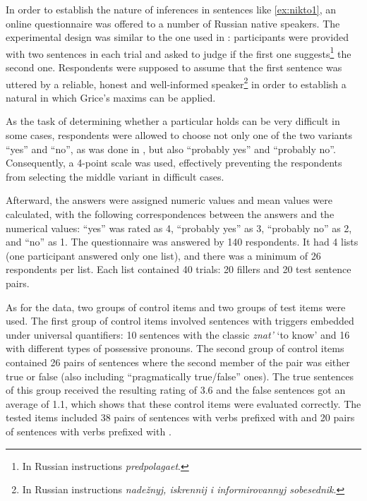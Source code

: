 In order to establish the nature of inferences in sentences like \ref{ex:nikto1}, an online questionnaire was offered to a number of Russian native speakers. The experimental design was similar to the one used in \citealt{Chemla:09}: participants were provided with two sentences in each trial and asked to judge if the first one suggests\footnote{In Russian instructions \textit{predpolagaet}.} the second one. Respondents were supposed to assume that the first sentence was uttered by a reliable, honest and well-informed speaker\footnote{In Russian instructions \textit{nade\v{z}nyj, iskrennij i informirovannyj sobesednik}.} in order to establish a natural  in which Grice's maxims can be applied.

As the task of determining whether a particular  holds can be very difficult in some cases, respondents were allowed to choose not only one of the two variants ``yes'' and ``no'', as was done in \citealt{Chemla:09}, but also ``probably yes'' and ``probably no''. Consequently, a 4-point scale was used, effectively preventing the respondents from selecting the middle variant in difficult cases.

Afterward, the answers were assigned numeric values and mean values were calculated, with the following correspondences between the answers and the numerical values: ``yes'' was rated as 4, ``probably yes'' as 3, ``probably no'' as 2, and ``no'' as 1. The questionnaire was answered by 140 respondents. It had 4 lists (one participant answered only one list), and there was a minimum of 26 respondents per list. Each list contained 40 trials: 20 fillers and 20 test sentence pairs.

As for the data, two groups of control items and two groups of test items were used. The first group of control items involved sentences with  triggers embedded under universal quantifiers: 10 sentences with the classic  \textit{znat'} `to know' and 16 with different types of possessive pronouns. The second group of control items contained 26 pairs of sentences where the second member of the pair was either true or false (also including ``pragmatically true/false'' ones). The true sentences of this group received the resulting rating of 3.6 and the false sentences got an average of 1.1, which shows that these control items were evaluated correctly. The tested items included 38 pairs of sentences with verbs prefixed with  and 20 pairs of sentences with verbs prefixed with .\largerpage

